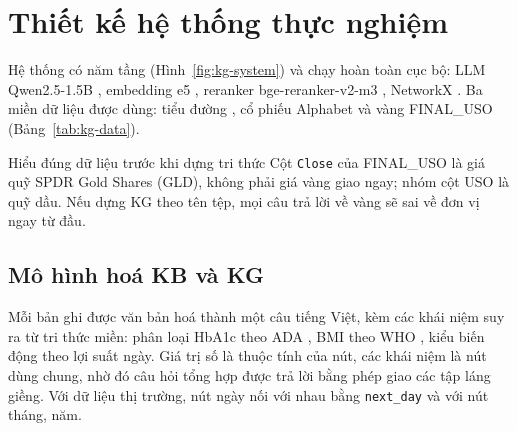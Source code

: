 
\section{Thiết kế hệ thống thực nghiệm}\label{sec:kg-system}
Hệ thống có năm tầng (Hình~\ref{fig:kg-system}) và chạy hoàn toàn cục bộ: LLM Qwen2.5-1.5B \cite{ch5:qwen2024}, embedding e5 \cite{ch5:wang2022e5}, reranker bge-reranker-v2-m3 \cite{ch5:chen2024bge}, NetworkX \cite{ch0:hagberg2008}. Ba miền dữ liệu được dùng: tiểu đường \cite{ch5:kaggle_diabetes}, cổ phiếu Alphabet \cite{ch5:kaggle_google} và vàng FINAL\_USO \cite{ch4:data_gold} (Bảng~\ref{tab:kg-data}).


\begin{luuy}{Hiểu đúng dữ liệu trước khi dựng tri thức}
Cột \texttt{Close} của FINAL\_USO là giá quỹ SPDR Gold Shares (GLD), không phải giá vàng giao ngay; nhóm cột USO là quỹ dầu. Nếu dựng KG theo tên tệp, mọi câu trả lời về vàng sẽ sai về đơn vị ngay từ đầu.
\end{luuy}

\subsection{Mô hình hoá KB và KG}
Mỗi bản ghi được văn bản hoá thành một câu tiếng Việt, kèm các khái niệm suy ra từ tri thức miền: phân loại HbA1c theo ADA \cite{ch5:ada2024}, BMI theo WHO \cite{ch5:who2000}, kiểu biến động theo lợi suất ngày. Giá trị số là thuộc tính của nút, các khái niệm là nút dùng chung, nhờ đó câu hỏi tổng hợp được trả lời bằng phép giao các tập láng giềng. Với dữ liệu thị trường, nút ngày nối với nhau bằng \texttt{next\_day} và với nút tháng, năm.



